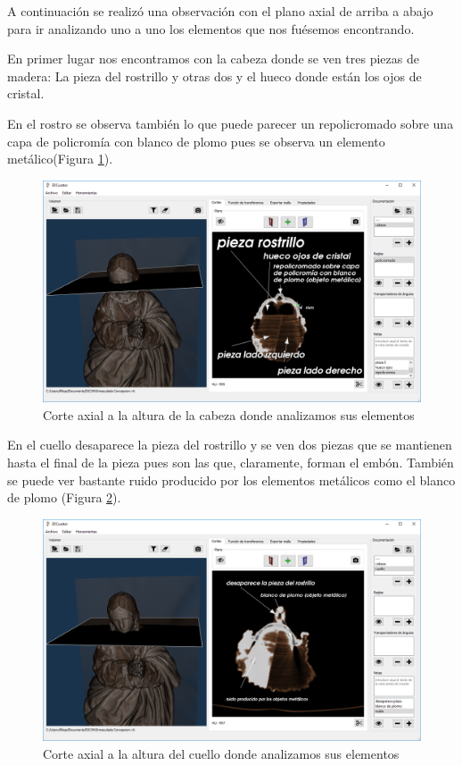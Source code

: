 A continuación se realizó una observación con el plano axial de arriba a abajo para ir analizando uno a uno los elementos que nos fuésemos encontrando.

En primer lugar nos encontramos con la cabeza donde se ven tres piezas de madera: La pieza del rostrillo y otras dos y el hueco donde están los ojos de cristal.

En el rostro se observa también lo que puede parecer un repolicromado sobre una capa de policromía con blanco de plomo pues se observa un elemento metálico(Figura \ref{fig:resultados/documentacion/inmaculada-concepcion/cabeza}).

\begin{figure}[H]
	\centering
	\includegraphics[width=12.5cm]{imagenes/resultados/documentacion/inmaculada-concepcion/cabeza}
	\caption{Corte axial a la altura de la cabeza donde analizamos sus elementos}
	\label{fig:resultados/documentacion/inmaculada-concepcion/cabeza}
\end{figure}

En el cuello desaparece la pieza del rostrillo y se ven dos piezas que se mantienen hasta el final de la pieza pues son las que, claramente, forman el embón. También se puede ver bastante ruido producido por los elementos metálicos como el blanco de plomo (Figura \ref{fig:resultados/documentacion/inmaculada-concepcion/cuello}).

\begin{figure}[H]
	\centering
	\includegraphics[width=12.5cm]{imagenes/resultados/documentacion/inmaculada-concepcion/cuello}
	\caption{Corte axial a la altura del cuello donde analizamos sus elementos}
	\label{fig:resultados/documentacion/inmaculada-concepcion/cuello}
\end{figure}

